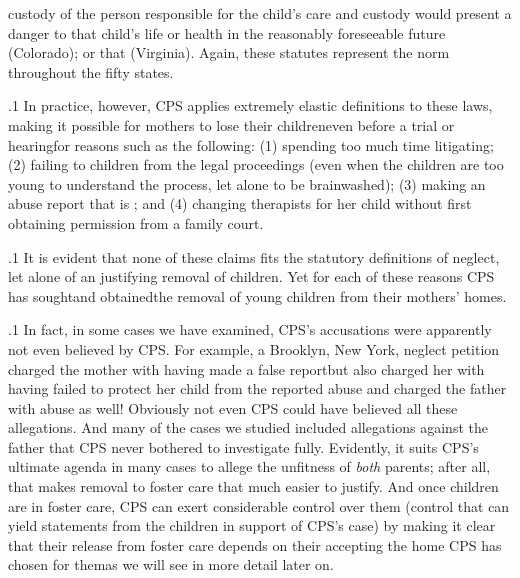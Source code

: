 \documentclass[11pt, twoside]{article}
\begin{document}
{{{custody of the person responsible for the child's care and custody would
present a danger to that child's life or health in the reasonably foreseeable future} (Colorado); or that 
(Virginia). Again, these statutes represent the norm throughout the
fifty states.
}%

\p.1{%
In practice, however, CPS applies extremely elastic definitions to
these laws, making it possible for mothers to lose their children\mdash{}even
before a trial or hearing\mdash{}for reasons such as the following: (1) spending
too much time litigating; (2) failing to  children from the legal
proceedings (even when the children are too young to understand the
process, let alone to be brainwashed); (3) making an abuse report that is
; and (4) changing therapists for her child without first
obtaining permission from a family court.
}%

\p.1{%
It is evident that none of these claims fits the statutory definitions of
neglect, let alone of an  justifying removal of children. Yet
for each of these reasons CPS has sought\mdash{}and obtained\mdash{}the removal
of young children from their mothers' homes.
}%

\p.1{%
In fact, in some cases we have examined, CPS's accusations were apparently not even believed by CPS. For example, a Brooklyn, New York,
neglect petition charged the mother with having made a false
report\mdash{}but also charged her with having failed to protect her child from the
reported abuse and charged the father with abuse as well! Obviously not
even CPS could have believed all these allegations. And many of the
cases we studied included allegations against the father that CPS never
bothered to investigate fully. Evidently, it suits CPS's ultimate agenda in
many cases to allege the unfitness of \textit{both} parents; after all, that makes
removal to foster care that much easier to justify. And once children are
in foster care, CPS can exert considerable control over them (control
that can yield statements from the children in support of CPS's case)
by making it clear that their release from foster care depends on their
accepting the home CPS has chosen for them\mdash{}as we will see in more
detail later on.
}%

}
\end{document}
